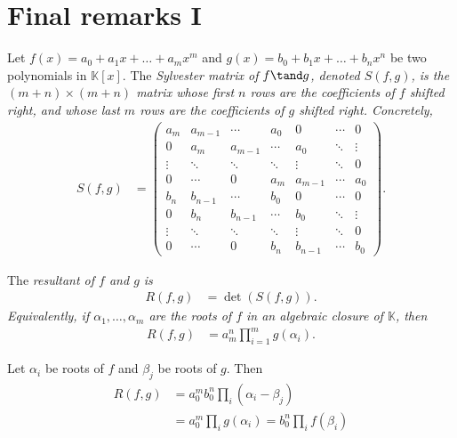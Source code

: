\documentclass[a4paper]{article}
\begin{document}
\section{Final remarks I}
\begin{tdefinition}
Let \(f(x)=a_{0}+a_{1}x+\dots+a_{m}x^{m}\) and \(g(x)=b_{0}+b_{1}x+\dots+b_{n}x^{n}\) be two polynomials in \(\mathbb{K}[x]\).
The \it{Sylvester matrix} of \( f\tand g \), denoted \(S(f,g)\), is the \((m+n)\times(m+n)\) matrix whose first \(n\) rows are the coefficients of \(f\) shifted right, and whose last \(m\) rows are the coefficients of \(g\) shifted right.
Concretely,
\begin{align*}
  S(f,g) &= \begin{pmatrix}
  a_{m}  & a_{m-1} & \cdots & a_{0}  & 0      & \cdots & 0      \\
  0      & a_{m}   & a_{m-1}& \cdots & a_{0}  & \ddots & \vdots \\
  \vdots & \ddots  & \ddots & \ddots & \vdots & \ddots & 0      \\
  0      & \cdots  & 0      & a_{m}  & a_{m-1}& \cdots & a_{0}  \\
  b_{n}  & b_{n-1} & \cdots & b_{0}  & 0      & \cdots & 0      \\
  0      & b_{n}   & b_{n-1}& \cdots & b_{0}  & \ddots & \vdots \\
  \vdots & \ddots  & \ddots & \ddots & \vdots & \ddots & 0      \\
  0      & \cdots  & 0      & b_{n}  & b_{n-1}& \cdots & b_{0}
\end{pmatrix}.
\end{align*}
\end{tdefinition}

\begin{tdefinition}[Resultant]
The \it{resultant} of \(f\) and \(g\) is
\begin{align*}
  R(f,g) &= \det\left(S(f,g)\right).
\end{align*}
Equivalently, if \(\alpha_{1},\dots,\alpha_{m}\) are the roots of \(f\) in an algebraic closure of \(\mathbb{K}\), then
\begin{align*}
  R(f,g) &= a_{m}^{n}\prod_{i=1}^{m}g(\alpha_{i}).
\end{align*}
\end{tdefinition}

\begin{ttheorem}
  Let \( \alpha_i \) be roots of \( f \) and \( \beta_j \) be roots of \( g \).
  Then \begin{align*}
    R(f,g) &= a_0^m b_0^n \prod_i(\alpha_i-\beta_j) \\
    &= a_0^m \prod_i g(\alpha_i) = b_0^n \prod_i f(\beta_i)
  \end{align*}
\end{ttheorem}
\end{document}
